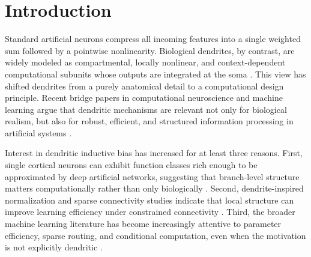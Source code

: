 \documentclass[preprint,12pt]{elsarticle}
\begin{document}
\section{Introduction}
\label{sec:introduction}

Standard artificial neurons compress all incoming features into a single weighted sum followed by a pointwise nonlinearity. Biological dendrites, by contrast, are widely modeled as compartmental, locally nonlinear, and context-dependent computational subunits whose outputs are integrated at the soma \cite{poirazi2003two,london2005dendritic,stuart2015dendritic,larkum2018perspective,ashhad2018stores,sinha2022active,kastellakis2023engram}. This view has shifted dendrites from a purely anatomical detail to a computational design principle. Recent bridge papers in computational neuroscience and machine learning argue that dendritic mechanisms are relevant not only for biological realism, but also for robust, efficient, and structured information processing in artificial systems \cite{deschutter2018deepcs,chavlis2021drawing,acharya2022dendriticcomputing,makarov2023efficiency,pagkalos2024leveraging,chavlis2025parameter}.

Interest in dendritic inductive bias has increased for at least three reasons. First, single cortical neurons can exhibit function classes rich enough to be approximated by deep artificial networks, suggesting that branch-level structure matters computationally rather than only biologically \cite{beniaguev2021single}. Second, dendrite-inspired normalization and sparse connectivity studies indicate that local structure can improve learning efficiency under constrained connectivity \cite{bird2021dendriticnorm,drix2018sparsecoding,fruengel2025sparseconnectivity}. Third, the broader machine learning literature has become increasingly attentive to parameter efficiency, sparse routing, and conditional computation, even when the motivation is not explicitly dendritic \cite{cheng2018compression,shazeer2017moe,frankle2019lottery,shaier2024moreexperts}.
\end{document}

